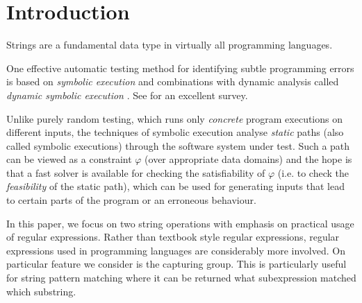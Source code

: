 
\section{Introduction}



%

Strings are a fundamental data type in virtually all programming languages.

One effective automatic testing method for identifying subtle programming errors  is based on \emph{symbolic execution}
\cite{king76} and combinations with dynamic analysis
called \emph{dynamic symbolic execution} \cite{jalangi,DART,EXE,CUTE,KLEE}.
See \cite{symbex-survey} for an excellent survey. 

Unlike purely random testing,
which runs only \emph{concrete} program executions on different
inputs, the techniques of symbolic execution analyse \emph{static} paths
(also called symbolic executions) through the software system under test.
Such a path can be viewed as a constraint $\varphi$ (over
appropriate data domains) and the hope is that a fast
solver is available for checking the satisfiability of $\varphi$ (i.e. to check
the \emph{feasibility} of the static path), which can be used for generating
inputs that lead to certain parts of the program or an erroneous behaviour.


%
In this paper, we focus on two string operations with emphasis on practical usage of  regular expressions. Rather than textbook style regular expressions, regular expressions used in programming languages are considerably more involved. On particular feature we consider is the capturing group. This is particularly useful for string pattern matching 
where it can be returned what subexpression matched which substring. 






